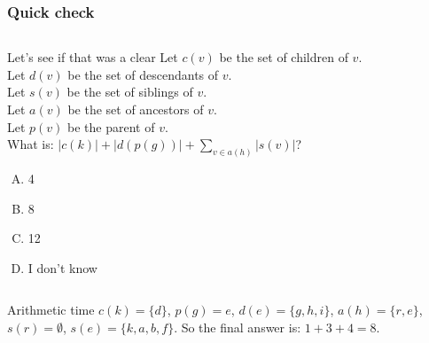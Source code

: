 \begin{frame}
	\frametitle{Quick check}
	
	\begin{columns}
		\pause
			\begin{questionblock}{Let's see if that was a clear}
				Let $c(v)$ be the set of children of $v$.\\
				Let $d(v)$ be the set of descendants of $v$.\\
				Let $s(v)$ be the set of siblings of $v$.\\
				Let $a(v)$ be the set of ancestors of $v$.\\
				Let $p(v)$ be the parent of $v$.\\
				What is: $|c(k)| + |d(p(g))| + \sum\limits_{v \in a(h)} |s(v)|$?
				\begin{multicols}{2}
				\begin{enumerate}[A.]
					\item 4
					\item 8
					\item 12
					\item I don't know
				\end{enumerate}
			\end{multicols}
			\end{questionblock}
	\end{columns}
	\pause
	\vspace{-5pt}
	\begin{answerblock}{Arithmetic time}
		$c(k) = \{d\}$, $p(g) = e$, $d(e) = \{g,h,i\}$, $a(h) = \{r,e\}$, $s(r) = \emptyset$, $s(e) = \{k,a,b,f\}$. So the
		final answer is: $1+3+4=8$.
	\end{answerblock}
\end{frame}
